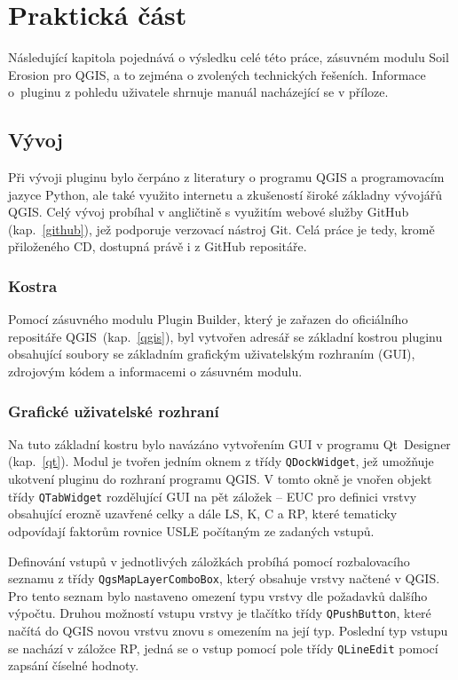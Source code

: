 \chapter{Praktická část}
\label{4-prakticka-cast} Následující kapitola pojednává o výsledku
celé této práce, zásuvném modulu Soil Erosion pro QGIS, a to zejména o
zvolených technických řešeních. Informace o~pluginu z pohledu
uživatele shrnuje manuál nacházející se v příloze.
\section{Vývoj} Při vývoji pluginu bylo čerpáno z literatury o
programu QGIS\cite{masteringQgis} a programovacím jazyce
Python\cite{learningPython}\cite{diveIntoPython}, ale také využito
internetu a zkušeností široké základny vývojářů
QGIS\cite{stackexchange}. Celý vývoj probíhal v angličtině s využitím
webové služby GitHub (kap.~\ref{github}), jež podporuje verzovací
nástroj Git. Celá práce je tedy, kromě přiloženého CD, dostupná právě
i z GitHub repositáře\cite{mujgithub}.
\subsection{Kostra} Pomocí zásuvného modulu Plugin Builder, který je
zařazen do oficiálního repositáře QGIS~(kap.~\ref{qgis}), byl vytvořen
adresář se základní kostrou pluginu obsahující soubory se základním
grafickým uživatelským rozhraním (GUI), zdrojovým kódem a informacemi
o zásuvném modulu.
\subsection{Grafické uživatelské rozhraní} Na tuto základní kostru
bylo navázáno vytvořením GUI v programu
Qt~Designer (kap.~\ref{qt}). Modul je tvořen jedním oknem z třídy
\texttt{QDockWidget}, jež umožňuje ukotvení pluginu do rozhraní
programu QGIS. V tomto okně je vnořen objekt třídy \texttt{QTabWidget}
rozdělující GUI na pět záložek – EUC pro definici vrstvy obsahující
erozně uzavřené celky a dále LS, K, C a RP, které tematicky odpovídají
faktorům rovnice USLE počítaným ze zadaných vstupů.

Definování vstupů v jednotlivých záložkách probíhá pomocí
rozbalovacího seznamu z třídy \texttt{QgsMapLayerComboBox}, který
obsahuje vrstvy načtené v QGIS. Pro tento seznam bylo nastaveno
omezení typu vrstvy dle požadavků dalšího výpočtu.  Druhou možností
vstupu vrstvy je tlačítko třídy \texttt{QPushButton}, které načítá do
QGIS novou vrstvu znovu s omezením na její typ. Poslední typ vstupu se
nachází v záložce RP, jedná se o vstup pomocí pole třídy
\texttt{QLineEdit} pomocí zapsání číselné hodnoty.

